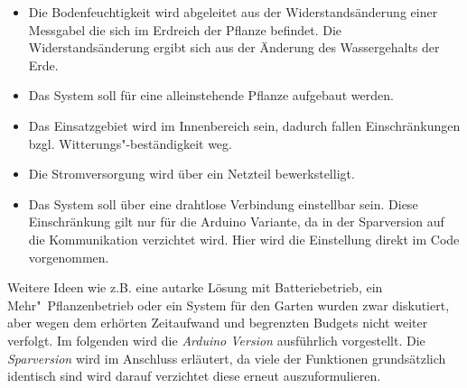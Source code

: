 \documentclass[]{IEEEtran}
\begin{document}
\begin{itemize}
	\item Die Bodenfeuchtigkeit wird abgeleitet aus der Widerstandsänderung einer Messgabel die sich im Erdreich der Pflanze befindet. Die Widerstandsänderung ergibt sich aus der Änderung des Wassergehalts der Erde.
	\item Das System soll für eine alleinstehende Pflanze aufgebaut werden. 
	\item Das Einsatzgebiet wird im Innenbereich sein, dadurch fallen Einschränkungen bzgl. Witterungs"-beständigkeit weg.
	\item Die Stromversorgung wird über ein Netzteil bewerkstelligt. 
	\item Das System soll über eine drahtlose Verbindung einstellbar sein. Diese Einschränkung gilt nur für die Arduino Variante, da in der Sparversion auf die Kommunikation verzichtet wird. Hier wird die Einstellung direkt im Code vorgenommen.

\end{itemize}

Weitere Ideen wie z.B. eine autarke Lösung mit Batteriebetrieb, ein Mehr"~Pflanzenbetrieb oder ein System für den Garten wurden zwar diskutiert, aber wegen dem erhörten Zeitaufwand und begrenzten Budgets nicht weiter verfolgt. 
Im folgenden wird die \emph{Arduino Version} ausführlich vorgestellt. 
Die \emph{Sparversion} wird im Anschluss erläutert, da viele der Funktionen grundsätzlich identisch sind wird darauf verzichtet diese erneut auszuformulieren. 







\end{document}

